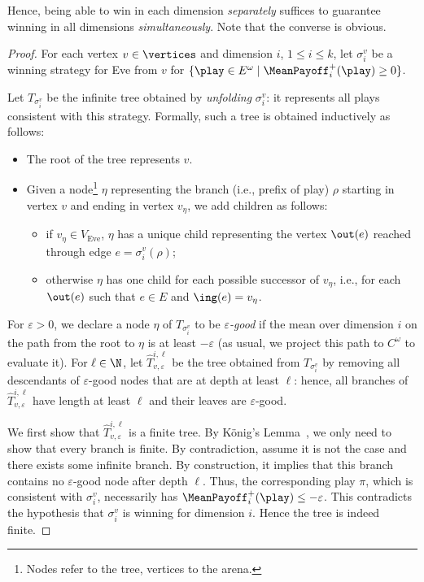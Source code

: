 Hence, being able to win in each dimension \textit{separately} suffices to guarantee winning in all dimensions \textit{simultaneously}. Note that the converse is obvious.

\begin{proof}
For each vertex $v \in \vertices$ and dimension $i$, $1 \leq i \leq k$, let $\sigma_i^v$ be a winning strategy for Eve from $v$ for $\{\play \in E^\omega \mid \MeanPayoff^{+}_{i}(\play) \geq 0\}$.

Let $T_{\sigma_i^v}$ be the infinite tree obtained by \textit{unfolding}  $\sigma_i^v$: it represents all plays consistent with this strategy. Formally, such a tree is obtained inductively as follows:
\begin{itemize}
\item The root of the tree represents $v$.
\item Given a node\footnote{Nodes refer to the tree, vertices to the arena.} $\eta$ representing the branch (i.e., prefix of play) $\rho$ starting in vertex $v$ and ending in vertex $v_\eta$, we add children as follows:
\begin{itemize}
\item if $v_\eta \in V_{\text{Eve}}$, $\eta$ has a unique child representing the vertex $\out(e)$ reached through edge $e = \sigma_i^v(\rho)$;
\item otherwise $\eta$ has one child for each possible successor of $v_\eta$, i.e., for each $\out(e)$ such that $e \in E$ and $\ing(e) = v_\eta$.
\end{itemize} 
\end{itemize} 
For $\varepsilon > 0$, we declare a node $\eta$ of $T_{\sigma_i^v}$ to be \textit{$\varepsilon$-good} if the mean over dimension $i$ on the path from the root to $\eta$ is at least $-\varepsilon$ (as usual, we project this path to $C^\omega$ to evaluate it). For $\ell \in \N$, let $\widehat{T}^{i, \ell}_{v, \varepsilon}$ be the tree obtained from $T_{\sigma_i^v}$ by removing all descendants of $\varepsilon$-good nodes that are at depth at least $\ell$: hence, all branches of $\widehat{T}^{i, \ell}_{v, \varepsilon}$ have length at least $\ell$ and their leaves are $\varepsilon$-good.

We first show that $\widehat{T}^{i, \ell}_{v, \varepsilon}$ is a finite tree. By K\"onig's Lemma~\cite{Konig:1936}, we only need to show that every branch is finite. By contradiction, assume it is not the case and there exists some infinite branch. By construction, it implies that this branch contains no $\varepsilon$-good node after depth $\ell$. Thus, the corresponding play $\pi$, which is consistent with $\sigma_i^v$, necessarily has $\MeanPayoff^{+}_{i}(\play) \leq -\varepsilon$. This contradicts the hypothesis that $\sigma_i^v$ is winning for dimension $i$. Hence the tree is indeed finite.


\end{proof}
